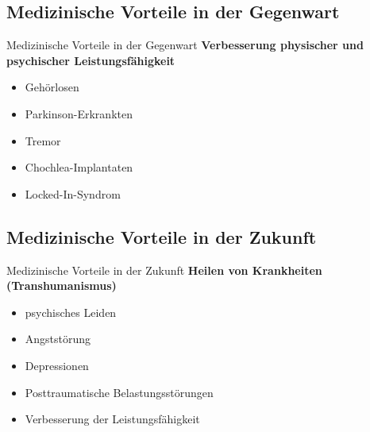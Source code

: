 \documentclass[aspectratio=169,16pt,xcolor=table]{beamer}
\begin{document}
\subsection{Medizinische Vorteile in der Gegenwart}
\begin{frame}{Medizinische Vorteile in der Gegenwart}
\textbf{Verbesserung physischer und psychischer Leistungsfähigkeit}
	\begin{itemize}
		\item{Gehörlosen}
		\item{Parkinson-Erkrankten}
		\item{Tremor}
    \item{Chochlea-Implantaten}
    \item{Locked-In-Syndrom}
        \end{itemize}
\end{frame}


\subsection{Medizinische Vorteile in der Zukunft}
\begin{frame}{Medizinische Vorteile in der Zukunft}
\textbf{Heilen von Krankheiten (Transhumanismus)}
	\begin{itemize}
		\item{psychisches Leiden}
		\item{Angststörung}
		\item{Depressionen}
    \item{Posttraumatische Belastungsstörungen}
    \item{Verbesserung der Leistungsfähigkeit}
        \end{itemize}
\end{frame}

\end{document}
